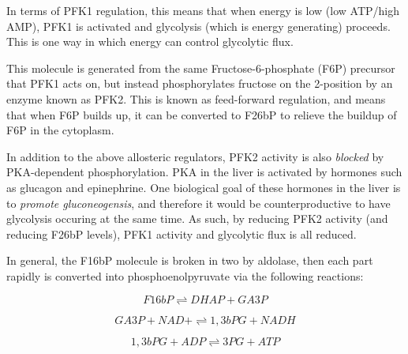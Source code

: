 \documentclass{tufte-handout}
\begin{document}
  In terms of PFK1 regulation, this means that when energy is low (low ATP/high AMP), PFK1 is activated and glycolysis (which is energy generating) proceeds.  This is one way in which energy can control glycolytic flux.

  This molecule is generated from the same Fructose-6-phosphate (F6P) precursor that PFK1 acts on, but instead phosphorylates fructose on the 2-position by an enzyme known as PFK2.  This is known as feed-forward regulation, and means that when F6P builds up, it can be converted to F26bP to relieve the buildup of F6P in the cytoplasm.

  In addition to the above allosteric regulators, PFK2 activity is also \emph{blocked} by PKA-dependent phosphorylation.  PKA in the liver is activated by hormones such as glucagon and epinephrine.  One biological goal of these hormones in the liver is to \emph{promote gluconeogensis}, and therefore it would be counterproductive to have glycolysis occuring at the same time.  As such, by reducing PFK2 activity (and reducing F26bP levels), PFK1 activity and glycolytic flux is all reduced.

  In general, the F16bP molecule is broken in two by aldolase, then each part rapidly is converted into phosphoenolpyruvate via the following reactions:

\begin{equation}\label{eq:aldolase-a}
F16bP \rightleftharpoons DHAP+ GA3P
\end{equation}

\begin{equation}\label{eq:g3pdh}
GA3P + NAD+ \rightleftharpoons 1,3bPG  + NADH
\end{equation}

\begin{equation}\label{eq:pgk}
1,3bPG + ADP \rightleftharpoons 3PG + ATP
\end{equation}
\end{document}

